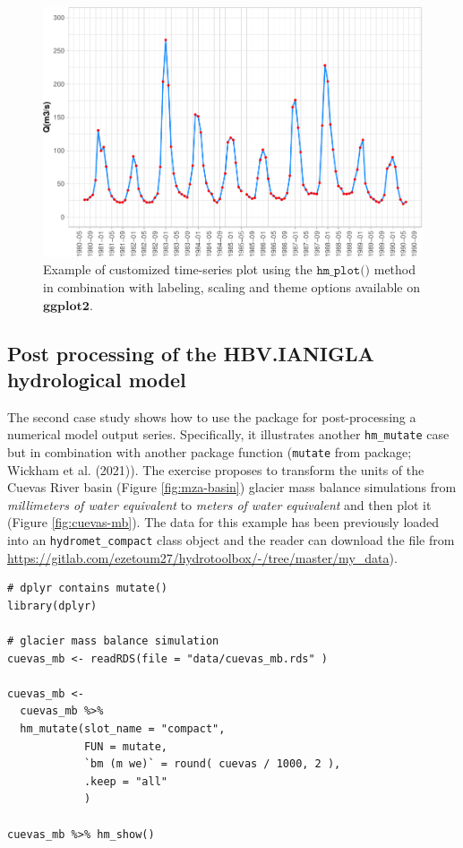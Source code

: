 \begin{figure}

{\centering \includegraphics[width=1\linewidth]{toum_files/figure-latex/guido-ggplot-1} 

}

\caption{Example of customized time-series plot using the $\texttt{hm\_plot()}$ method in combination with labeling, scaling and theme options available on $\textbf{ggplot2}$.}\label{fig:guido-ggplot}
\end{figure}

\hypertarget{post-processing-of-the-hbv.ianigla-hydrological-model}{%
\subsection{Post processing of the HBV.IANIGLA hydrological model}\label{post-processing-of-the-hbv.ianigla-hydrological-model}}

The second case study shows how to use the package for post-processing a
numerical model output series. Specifically, it illustrates another
\texttt{hm\_mutate} case but in combination with another package function
(\texttt{mutate} from  package; Wickham et al. (2021)). The exercise
proposes to transform the units of the Cuevas River basin
(Figure \ref{fig:mza-basin}) glacier mass balance simulations
from \emph{millimeters of water equivalent} to \emph{meters of water equivalent}
and then plot it (Figure \ref{fig:cuevas-mb}). The
data for this example has been previously loaded into an
\texttt{hydromet\_compact} class object and the reader can download
the file from \url{https://gitlab.com/ezetoum27/hydrotoolbox/-/tree/master/my_data}).

\begin{verbatim}
# dplyr contains mutate()
library(dplyr) 

# glacier mass balance simulation
cuevas_mb <- readRDS(file = "data/cuevas_mb.rds" )

cuevas_mb <- 
  cuevas_mb %>%
  hm_mutate(slot_name = "compact",
            FUN = mutate, 
            `bm (m we)` = round( cuevas / 1000, 2 ),
            .keep = "all"
            ) 

cuevas_mb %>% hm_show()
\end{verbatim}

